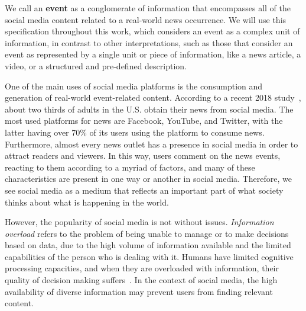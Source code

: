 We call an {\bf event} as a conglomerate of information that encompasses all
of the social media content related to a real-world news occurrence. 
%
We will use this specification throughout this work, which considers an event as
a complex unit of information, in contrast to other interpretations, such as
those that consider an event as represented by a single unit or piece of
information, like a news article, a video, or a structured and pre-defined
description.

One of the main uses of social media platforms is the consumption and generation
of real-world event-related content. 
%
According to a recent 2018 study~\cite{pewresearch}, about two thirds of adults
in the U.S. obtain their news from social media.
%
The most used platforms for news are Facebook, YouTube, and Twitter, with the
latter having over 70\% of its users using the platform to consume news.
%
Furthermore, almost every news outlet has a presence in social media
in order to attract readers and viewers.
%
In this way, users comment on the news events, reacting to them according to a
myriad of factors, and many of these characteristics are present in one way or
another in social media.
%
Therefore, we see social media as a medium that reflects an important 
part of what society thinks about what is happening in the world.





However, the popularity of social media is not without issues. 
%
{\em Information overload} refers to the problem of being unable to manage or to
make decisions based on data, due to the high volume of information available
and the limited capabilities of the person who is dealing with it. 
%
Humans have limited cognitive processing capacities, and when they are
overloaded with information, their quality of decision making
suffers~\cite{gross1964managing}. 
%
In the context of social media, the high availability of diverse information may
prevent users from finding relevant content.


